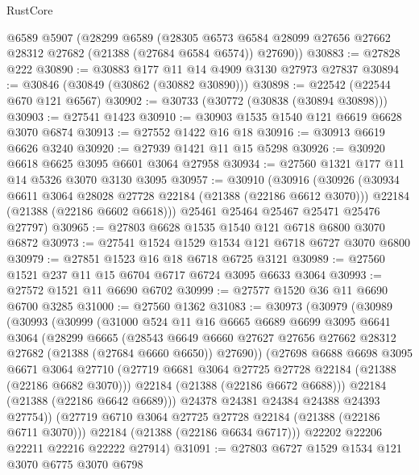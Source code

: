 \begin{lexlean}{RustCore}
\begin{coremodule}
    @6589
    @5907
    (@28299
      @6589
      (@28305 @6573 @6584 @28099 @27656 @27662 @28312 @27682 (@21388 (@27684 @6584 @6574)) @27690))
@30883 := @27828 @222
@30890 := @30883 @177 @11 @14 @4909 @3130 @27973 @27837
@30894 := @30846 (@30849 (@30862 (@30882 @30890)))
@30898 := @22542 (@22544 @670 @121 @6567)
@30902 := @30733 (@30772 (@30838 (@30894 @30898)))
@30903 := @27541 @1423
@30910 := @30903 @1535 @1540 @121 @6619 @6628 @3070 @6874
@30913 := @27552 @1422 @16 @18
@30916 := @30913 @6619 @6626 @3240
@30920 := @27939 @1421 @11 @15 @5298
@30926 := @30920 @6618 @6625 @3095 @6601 @3064 @27958
@30934 := @27560 @1321 @177 @11 @14 @5326 @3070 @3130 @3095
@30957 := @30910
    (@30916
      (@30926
        (@30934 @6611 @3064 @28028 @27728 @22184 (@21388 (@22186 @6612 @3070)))
        @22184
        (@21388 (@22186 @6602 @6618)))
      @25461
      @25464
      @25467
      @25471
      @25476
      @27797)
@30965 := @27803 @6628 @1535 @1540 @121 @6718 @6800 @3070 @6872
@30973 := @27541 @1524 @1529 @1534 @121 @6718 @6727 @3070 @6800
@30979 := @27851 @1523 @16 @18 @6718 @6725 @3121
@30989 := @27560 @1521 @237 @11 @15 @6704 @6717 @6724 @3095 @6633 @3064
@30993 := @27572 @1521 @11 @6690 @6702
@30999 := @27577 @1520 @36 @11 @6690 @6700 @3285
@31000 := @27560 @1362
@31083 := @30973
    (@30979
      (@30989
        (@30993
          (@30999
            (@31000
              @524
              @11
              @16
              @6665
              @6689
              @6699
              @3095
              @6641
              @3064
              (@28299
                @6665
                (@28543
                  @6649
                  @6660
                  @27627
                  @27656
                  @27662
                  @28312
                  @27682
                  (@21388 (@27684 @6660 @6650))
                  @27690))
              (@27698
                @6688
                @6698
                @3095
                @6671
                @3064
                @27710
                (@27719 @6681 @3064 @27725 @27728 @22184 (@21388 (@22186 @6682 @3070)))
                @22184
                (@21388 (@22186 @6672 @6688)))
              @22184
              (@21388 (@22186 @6642 @6689)))
            @24378
            @24381
            @24384
            @24388
            @24393
            @27754))
        (@27719 @6710 @3064 @27725 @27728 @22184 (@21388 (@22186 @6711 @3070)))
        @22184
        (@21388 (@22186 @6634 @6717)))
      @22202
      @22206
      @22211
      @22216
      @22222
      @27914)
@31091 := @27803 @6727 @1529 @1534 @121 @3070 @6775 @3070 @6798

\end{coremodule}
\end{lexlean}

